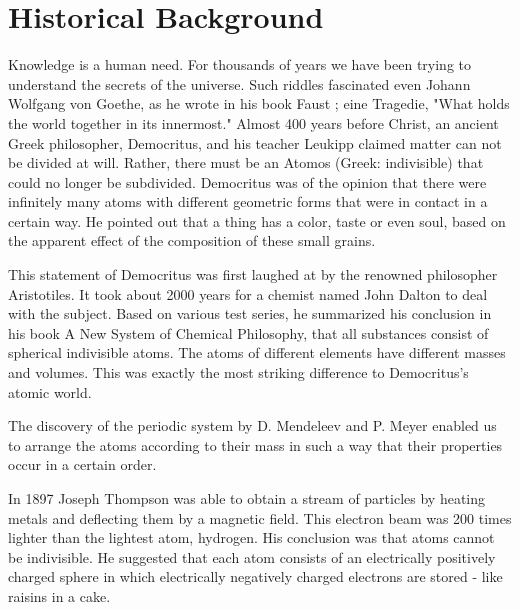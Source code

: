 \section*{Historical Background}
Knowledge is a human need. For thousands of years we have been trying to understand the secrets of the universe. Such riddles fascinated even Johann Wolfgang von Goethe, as he wrote in his book Faust \cite{goethe1921faust}; eine Tragedie, "What holds the world together in its innermost." 
Almost 400 years before Christ, an ancient Greek philosopher, Democritus, and his teacher Leukipp claimed matter can not be divided at will. Rather, there must be an Atomos (Greek: indivisible) that could no longer be subdivided.
Democritus was of the opinion that there were infinitely many atoms with different geometric forms that were in contact in a certain way. He pointed out that a thing has a color, taste or even soul, based on the apparent effect of the composition of these small grains.
\cite{capelle1968vorsokratiker}

This statement of Democritus was first laughed at by the renowned philosopher Aristotiles. It took about 2000 years for a chemist named John Dalton to deal with the subject. Based on various test series, he summarized his conclusion in his book A New System of Chemical Philosophy, that all substances consist of spherical indivisible atoms. The atoms of different elements have different masses and volumes. This was exactly the most striking difference to Democritus's atomic world.\cite{dalton2010new}

The discovery of the periodic system by D. Mendeleev and P. Meyer enabled us to arrange the atoms according to their mass in such a way that their properties occur in a certain order.\cite{haken2013atom}

In 1897 Joseph Thompson was able to obtain a stream of particles by heating metals and deflecting them by a magnetic field. This electron beam was 200 times lighter than the lightest atom, hydrogen.
His conclusion was that atoms cannot be indivisible. He suggested that each atom consists of an electrically positively charged sphere in which electrically negatively charged electrons are stored - like raisins in a cake.

